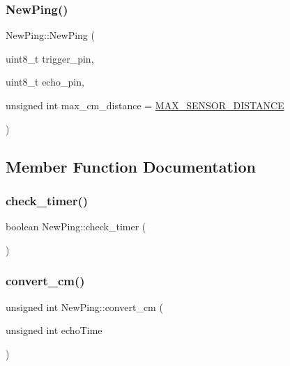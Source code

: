 \subsubsection{\texorpdfstring{New\+Ping()}{NewPing()}}
{\footnotesize\ttfamily New\+Ping\+::\+New\+Ping (\begin{DoxyParamCaption}\item[{uint8\+\_\+t}]{trigger\+\_\+pin,  }\item[{uint8\+\_\+t}]{echo\+\_\+pin,  }\item[{unsigned int}]{max\+\_\+cm\+\_\+distance = {\ttfamily \mbox{\hyperlink{_new_ping_8h_a066008eaba26c8638c448b56bc6e1ea4}{M\+A\+X\+\_\+\+S\+E\+N\+S\+O\+R\+\_\+\+D\+I\+S\+T\+A\+N\+CE}}} }\end{DoxyParamCaption})}



\subsection{Member Function Documentation}
\mbox{\label{class_new_ping_a225128afccd4bb37f137669bb1064cbd}} 
\subsubsection{\texorpdfstring{check\+\_\+timer()}{check\_timer()}}
{\footnotesize\ttfamily boolean New\+Ping\+::check\+\_\+timer (\begin{DoxyParamCaption}{ }\end{DoxyParamCaption})}

\mbox{\label{class_new_ping_a48beafc2846a2e5b069c25572f4ba360}} 
\subsubsection{\texorpdfstring{convert\+\_\+cm()}{convert\_cm()}}
{\footnotesize\ttfamily unsigned int New\+Ping\+::convert\+\_\+cm (\begin{DoxyParamCaption}\item[{unsigned int}]{echo\+Time }\end{DoxyParamCaption})\hspace{0.3cm}{\ttfamily [static]}}

